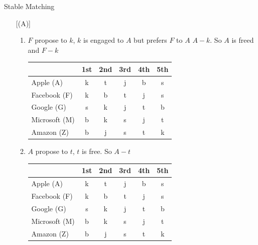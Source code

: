 \documentclass{article}
\numberwithin{table}{section}
\numberwithin{figure}{section}
\begin{document}
\begin{section}{Stable Matching}
\begin{enumerate} [(A)]
\begin{enumerate}[(1)]
\begin{tcolorbox}[breakable]
\begin{enumerate}[(1)]
                    \item $F$ propose to $k$, $k$ is engaged to $A$ but prefers $F$ to $A$ \textrightarrow $A-k$. So $A$ is freed and $F-k$
                    \begin{table}[H]
                        \centering
                        \begin{tabular}{|m{2.5cm}|*{5}{c|}}
                            \hline
                            & 1st & 2nd & 3rd & 4th & 5th \\
                            \hline
                            Apple (A)        & {\color{blue} k} & t & j & b & s \\
                            Facebook (F)     & {\color{red} k} & b & t & j & s \\
                            Google (G)       & s & k & j & t & b \\
                            Microsoft (M)    & b & k & s & j & t \\
                            Amazon (Z)       & b & j & s & t & k \\
                            \hline                            
                        \end{tabular}
                    \end{table}                    

                    \item $A$ propose to $t$, $t$ is free. So $A-t$
                    \begin{table}[H]
                        \centering
                        \begin{tabular}{|m{2.5cm}|*{5}{c|}}
                            \hline
                            & 1st & 2nd & 3rd & 4th & 5th \\
                            \hline
                            Apple (A)        & {\color{blue} k} & {\color{red} t} & j & b & s \\
                            Facebook (F)     & {\color{red} k} & b & t & j & s \\
                            Google (G)       & s & k & j & t & b \\
                            Microsoft (M)    & b & k & s & j & t \\
                            Amazon (Z)       & b & j & s & t & k \\
                            \hline                            
                        \end{tabular}
                    \end{table}                    


\end{enumerate}
\end{tcolorbox}
\end{enumerate}
\end{enumerate}
\end{section}
\end{document}
